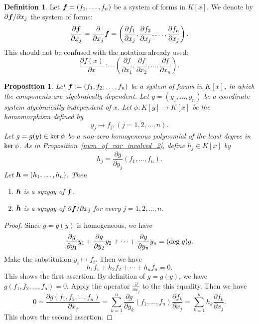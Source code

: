\documentclass[12pt]{article}
\newtheorem{proposition}[theorem]{Proposition}
\theoremstyle{definition}
\newtheorem{definition}[theorem]{Definition}
\theoremstyle{remark}
\newtheorem{example}[theorem]{Example}
\def\ker{{\rm ker}}
\def\deg{{\rm deg}}
\def\boldh{\mbox{\boldmath $h$}}
\def\boldf{\mbox{\boldmath $f$}}
\def\pa{\partial}
\begin{document}

\begin{definition}  %
Let $\boldf=(f_1, \ldots, f_n)$ be a system of forms in $K[x]$.  
We denote by   ${\pa \boldf}/{\pa x_j}$ the 
system of forms: 
\[\frac{\pa \boldf}{\pa x_j}=\frac{\pa}{\pa x_j}\boldf=\left(\frac{\pa f_1}{\pa x_j}, \frac{\pa f_2}{\pa x_j}, \ldots , \frac{\pa f_n}{\pa x_j}\right).\]
This should not be confused with the notation already used:  
\[\frac{\pa f(x)}{\pa x}:=\left(\frac{\pa f}{\pa x_1}, \frac{\pa f}{\pa x_2}, \ldots, \frac{\pa f}{\pa x_n}\right).\]
\end{definition}


\begin{proposition} \label{system_associated_to_alg_dep_system_is_svs} %
Let  $\boldf:=(f_1, f_2, \ldots, f_n) $ be  a system of forms in $K[x]$, in which the components are 
algebraically dependent. 
Let $y=(y_1, \ldots, y_n)$ be a coordinate system  algebraically independent of $x$. 
Let $\phi : K[y] \rightarrow K[x]$ be the homomorphism defined by 
\[y_j \mapsto f_j, (j=1, 2, \ldots, n).\] 
Let $g=g(y) \in \ker \, \phi$ be a non-zero homogeneous polynomial of the least degree 
in $\ker\, \phi$.    
As in Proposition~\ref{num_of_var_involved_2},  define $h_j \in K[x]$ by  
\[h_j=\frac{\pa g}{\pa y_j}(f_1, \ldots, f_n).\]
Let $\boldh=(h_1, \ldots, h_n)$.  
Then 
\begin{enumerate}
\item[{\rm (a)}] 
$\boldh$ is a syzygy of $\boldf$.   
\item[{\rm (b)}]
$\boldh$ is a syzygy  of $\pa \boldf/\pa x_j$ for every $j=1,2, \ldots, n$.   
\end{enumerate}
\end{proposition}

\begin{proof}
Since $g=g(y)$ is homogeneous, we have 
\[\frac{\pa g}{\pa y_1}y_1 + \frac{\pa g}{\pa y_2}y_2 + \cdots +\frac{\pa g}{\pa y_n}y_n = (\deg \; g)g. \]
Make the substitution $y_i \mapsto f_i$. 
Then we have 
\[h_1f_1 + h_2f_2 + \cdots +h_nf_n=0.\]
This shows the first assertion.  
By definition of $g=g(y)$, we have $g(f_1, f_2, \ldots, f_n)=0$. 
Apply the operator $\frac{\pa}{\pa x_j}$ to the this equality. Then we have 
\[0=\frac{\pa g(f_1, f_2, \ldots , f_n)}{\pa x_j}= 
\sum _{k=1}^n \frac{\pa g}{\pa y_k}(f_1, \ldots, f_n)\frac{\pa f_k}{\pa x_j} 
= \sum _{k=1}^nh_k\frac{\pa f_k}{\pa x_j}.  \]
This shows the second assertion. 
\end{proof}
\end{document}
